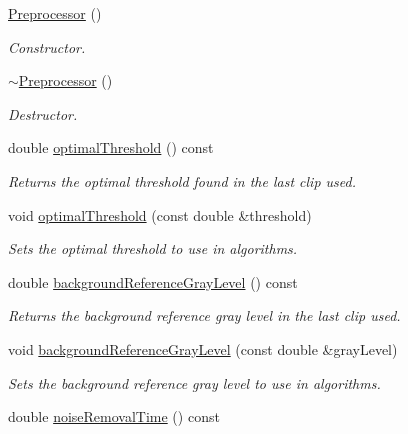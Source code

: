 \begin{CompactItemize}
\item 
\hyperlink{class_preprocessor_da966c8b83e7c3bcd8759549c3cdf688}{Preprocessor} ()
\begin{CompactList}\small\item\em Constructor. \item\end{CompactList}\item 
\hyperlink{class_preprocessor_3c16724bc9e18b12a45f5a7fe2752b1b}{$\sim$Preprocessor} ()
\begin{CompactList}\small\item\em Destructor. \item\end{CompactList}\item 
double \hyperlink{class_preprocessor_8cc19d799c87198f97356d41606aa4ac}{optimalThreshold} () const 
\begin{CompactList}\small\item\em Returns the optimal threshold found in the last clip used. \item\end{CompactList}\item 
void \hyperlink{class_preprocessor_50f1344cfbab71e64512c994ea4e3a03}{optimalThreshold} (const double \&threshold)
\begin{CompactList}\small\item\em Sets the optimal threshold to use in algorithms. \item\end{CompactList}\item 
double \hyperlink{class_preprocessor_159a9059fc811585eb9363e76ad16148}{backgroundReferenceGrayLevel} () const 
\begin{CompactList}\small\item\em Returns the background reference gray level in the last clip used. \item\end{CompactList}\item 
void \hyperlink{class_preprocessor_df20888f57b15f02ae0d7df536d97ef4}{backgroundReferenceGrayLevel} (const double \&grayLevel)
\begin{CompactList}\small\item\em Sets the background reference gray level to use in algorithms. \item\end{CompactList}\item 
double \hyperlink{class_preprocessor_0cccd23820430541f18f2b24dbfd0784}{noiseRemovalTime} () const 

\end{CompactItemize}
